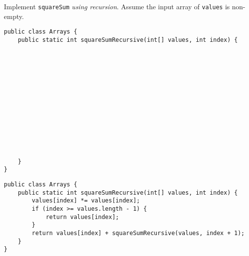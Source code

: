 \begin{blocksection}
\question Implement \lstinline$squareSum$ \emph{using recursion}. Assume the
input array of \lstinline$values$ is non-empty.

\ifprintanswers\else
\begin{lstlisting}
public class Arrays {
    public static int squareSumRecursive(int[] values, int index) {














    }
}
\end{lstlisting}
\fi

\begin{solution}
\begin{lstlisting}
public class Arrays {
    public static int squareSumRecursive(int[] values, int index) {
        values[index] *= values[index];
        if (index >= values.length - 1) {
            return values[index];
        }
        return values[index] + squareSumRecursive(values, index + 1);
    }
}
\end{lstlisting}
\end{solution}
\end{blocksection}
